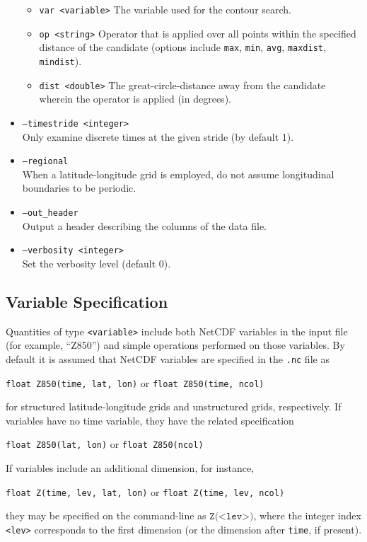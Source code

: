 \documentclass{article}
\begin{document}
\begin{itemize}
\begin{itemize}
\item[] \texttt{var <variable>}  The variable used for the contour search.
\item[] \texttt{op <string>}  Operator that is applied over all points within the specified distance of the candidate (options include \texttt{max}, \texttt{min}, \texttt{avg}, \texttt{maxdist}, \texttt{mindist}).
\item[] \texttt{dist <double>}  The great-circle-distance away from the candidate wherein the operator is applied (in degrees).
\end{itemize}
\item[] \texttt{--timestride <integer>} \\ Only examine discrete times at the given stride (by default 1).
\item[] \texttt{--regional} \\ When a latitude-longitude grid is employed, do not assume longitudinal boundaries to be periodic.
\item[] \texttt{--out\_header} \\ Output a header describing the columns of the data file.
\item[] \texttt{--verbosity <integer>} \\ Set the verbosity level (default 0).
\end{itemize}

\subsection{Variable Specification} \label{sec:VariableSpecification}

Quantities of type \texttt{<variable>} include both NetCDF variables in the input file (for example, ``Z850'') and simple operations performed on those variables.  By default it is assumed that NetCDF variables are specified in the \texttt{.nc} file as
\begin{center}
\texttt{float Z850(time, lat, lon)} \quad or \quad \texttt{float Z850(time, ncol)}
\end{center} for structured latitude-longitude grids and unstructured grids, respectively.  If variables have no time variable, they have the related specification
\begin{center}
\texttt{float Z850(lat, lon)} \quad or \quad \texttt{float Z850(ncol)}
\end{center}  If variables include an additional dimension, for instance,
\begin{center}
\texttt{float Z(time, lev, lat, lon)} \quad or \quad \texttt{float Z(time, lev, ncol)}
\end{center} they may be specified on the command-line as $\texttt{Z(<lev>)}$, where the integer index \texttt{<lev>} corresponds to the first dimension (or the dimension after \texttt{time}, if present).  
\end{document}
